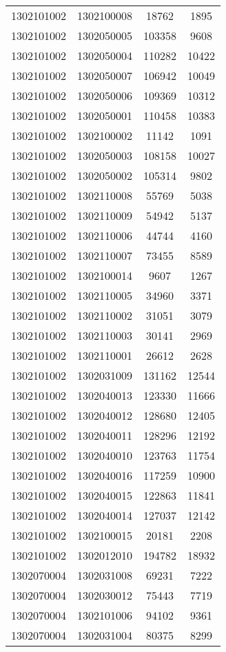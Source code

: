 \begin{longtable}{llcc}
1302101002 & 1302100008 & 18762 & 1895\\
1302101002 & 1302050005 & 103358 & 9608\\
1302101002 & 1302050004 & 110282 & 10422\\
1302101002 & 1302050007 & 106942 & 10049\\
1302101002 & 1302050006 & 109369 & 10312\\
1302101002 & 1302050001 & 110458 & 10383\\
1302101002 & 1302100002 & 11142 & 1091\\
1302101002 & 1302050003 & 108158 & 10027\\
1302101002 & 1302050002 & 105314 & 9802\\
1302101002 & 1302110008 & 55769 & 5038\\
1302101002 & 1302110009 & 54942 & 5137\\
1302101002 & 1302110006 & 44744 & 4160\\
1302101002 & 1302110007 & 73455 & 8589\\
1302101002 & 1302100014 & 9607 & 1267\\
1302101002 & 1302110005 & 34960 & 3371\\
1302101002 & 1302110002 & 31051 & 3079\\
1302101002 & 1302110003 & 30141 & 2969\\
1302101002 & 1302110001 & 26612 & 2628\\
1302101002 & 1302031009 & 131162 & 12544\\
1302101002 & 1302040013 & 123330 & 11666\\
1302101002 & 1302040012 & 128680 & 12405\\
1302101002 & 1302040011 & 128296 & 12192\\
1302101002 & 1302040010 & 123763 & 11754\\
1302101002 & 1302040016 & 117259 & 10900\\
1302101002 & 1302040015 & 122863 & 11841\\
1302101002 & 1302040014 & 127037 & 12142\\
1302101002 & 1302100015 & 20181 & 2208\\
1302101002 & 1302012010 & 194782 & 18932\\
1302070004 & 1302031008 & 69231 & 7222\\
1302070004 & 1302030012 & 75443 & 7719\\
1302070004 & 1302101006 & 94102 & 9361\\
1302070004 & 1302031004 & 80375 & 8299\\

\end{longtable}
